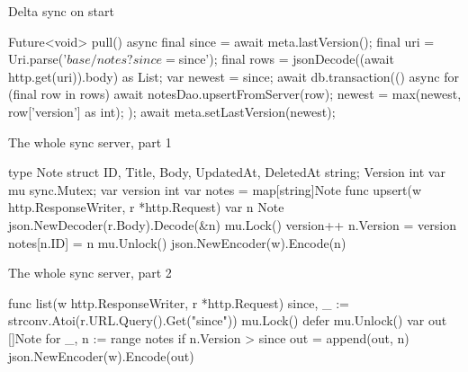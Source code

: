 \documentclass[10pt,aspectratio=169,t]{beamer}
\begin{document}
\begin{frame}[fragile,eyebrow=Task II]{Delta sync on start}
\begin{dart}
Future<void> pull() async {
  final since = await meta.lastVersion();
  final uri = Uri.parse('$base/notes?since=$since');
  final rows = jsonDecode((await http.get(uri)).body) as List;
  var newest = since;
  await db.transaction(() async {
    for (final row in rows) {
      await notesDao.upsertFromServer(row);
      newest = max(newest, row['version'] as int);
    }
  });
  await meta.setLastVersion(newest);
}
\end{dart}
\end{frame}

\begin{frame}[fragile,eyebrow=Reference]{The whole sync server, part 1}
\begin{golang}
type Note struct{ ID, Title, Body, UpdatedAt, DeletedAt string; Version int }
var mu sync.Mutex; var version int
var notes = map[string]Note{}
func upsert(w http.ResponseWriter, r *http.Request) {
  var n Note
  json.NewDecoder(r.Body).Decode(&n)
  mu.Lock()
  version++
  n.Version = version
  notes[n.ID] = n
  mu.Unlock()
  json.NewEncoder(w).Encode(n)
}
\end{golang}
\end{frame}

\begin{frame}[fragile,eyebrow=Reference]{The whole sync server, part 2}
\begin{golang}
func list(w http.ResponseWriter, r *http.Request) {
  since, _ := strconv.Atoi(r.URL.Query().Get("since"))
  mu.Lock()
  defer mu.Unlock()
  var out []Note
  for _, n := range notes {
    if n.Version > since {
      out = append(out, n)
    }
  }
  json.NewEncoder(w).Encode(out)
}
\end{golang}
\end{frame}
\end{document}
